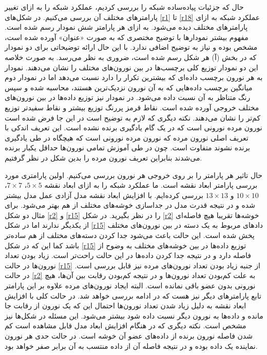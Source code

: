 \documentclass[12pt, a4paper]{article}
\begin{document}
حال که جزئیات پیاده‌ساده شبکه را بررسی کردیم، عملکرد شبکه را به ازای تغییر پارامتر‌های مختلف آن بررسی می‌کنیم.
در شکل‌های \ref{r1} تا \ref{r18} عملکرد شبکه به ازای پارامتر‌های مختلف دیده می‌شود.
به ازای هر پارامتر شش نمودار رسم شده است. مفهوم بیشتر نمودار‌ها
با توضیح مختصری که به صورت «عنوان» آورده شده است، مشخص بوده و نیاز به توضیح اضافی ندارد.
با این حال ارائه توضیحاتی برای دو نمودار که در بخش (آ) هر شکل رسم شده است، ضروری به نظر می‌رسد.
به صورت خلاصه این دو نمودار توزیع کلی برچسب‌ها در بین نورون‌های مختلف را نشان می‌دهند.
نمودار  به هر نورون برچسب داده‌ای که بیشترین تکرار را دارد نسبت می‌دهد اما در نمودار دوم میانگین برچسب
داده‌هایی که به آن نورون نزدیک‌ترین هستند، محاسبه شده و سپس رنگ متناظر به آن نسبت داده می‌شود. در نمودار 
نیز توزیع داده‌ها در بین نورون‌های مختلف خروجی آورده شده است. نقاط قرمز پررنگ توزیع بیشتر و نقاط سفید‌تر توزیع کم‌تر را
نشان می‌دهند. نکته دیگری که لازم به توضیح است در این جا فرض شده است نورون‌ مرده نورونی است که در یک گام یادگیری
برنده نشده است. این تعریف اندکی با تعریف اصلی نورون مرده که نورون مرده نورونی است که هیچگاه در طی یادگیری
برنده نشوند متفاوت است. چون در طی آموزش تمامی نورون‌ها حداقل یکبار برنده می‌شدند بنابراین تعریف نورون مرده را
بدین شکل در نظر گرفتیم.

حال تاثیر هر پارامتر را بر روی خروجی هر نورون بررسی می‌کنیم. اولین پارامتری مورد بررسی پارامتر ابعاد نقشه است.
ما عملکرد شبکه را به ازای ابعاد نقشه $5 \times 5$، $7 \times 7$، $10 \times 10$ و $13 \times 13$ بررسی کرده‌ایم.
با افزایش ابعاد نقشه مدل آزادی عمل مدل بیشتر شده و در نتیجه قدرت مدل در جداسازی ‌خوشه‌های مختلف از هم بهتر می‌شود.
برای مثال دو شکل \ref{r2} و \ref{r15} را در نظر بگیرید. در شکل \ref{r2} خوشه‌ها تقریبا هیچ فاصله‌ای از یکدیگر ندارند
اما در شکل \ref{r15} دادهای مربوط به یک دسته در بین نورون‌های مختلف پخش شده است. این حالت باعث می‌شود جدا کردن دسته‌‌های
مختلف از هم ساده‌تر باشد کما این که در  شکل \ref{r15} توزیع داده‌ها در بین خوشه‌های مختلف به وضوح از
فاصله دارد و در نتیجه جدا کردن داده‌ها در این حالت راحت‌تر است. زیاد بودن تعداد نورون‌ها در حالت \ref{r15} از جنبه
زیاد بودن تعداد نورون‌های مرده نیز قابل بررسی است. در حالت \ref{r2} به علت کم‌بودن تعداد نورون‌ها و در نتیجه کم‌بودن
رقابت بین آن‌ها، هیچ نورونی بدون عضو باقی نمانده است. البته ایجاد نورون‌های مرده علاوه بر این پارامتر تابع پارامترهای
دیگر نیز هست که در ادامه بررسی خواهد شد. در حالت کلی با افزایش ابعاد نقشه به دلیل زیاد شدن
تعداد نورون‌ها احتمال این که یک نورون از رقابت جا مانده و داده‌ها به نورون دیگر نسبت داده شود بیشتر می‌شود. این مسئله در
شکل‌ها نیز مشخص است. نکته دیگری که در هنگام افزایش ابعاد مدل قابل مشاهده است کم شدن فاصله نورون
برنده از داده‌های عضو آن خوشه است. در حالت حدی هر نورون نماینده یک داده بوده
و در نتیجه فاصله آن از داده منتسب به آن برابر صفر خواهد بود.
\end{document}
